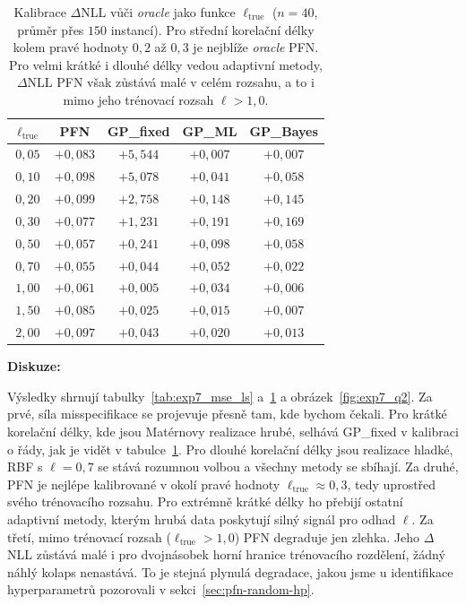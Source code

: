 \begin{table}[!htb]
    \centering
    \begin{tabular}{ccccc}
    \hline
    $\ell_{\text{true}}$ & PFN & GP\_fixed & GP\_ML & GP\_Bayes \\
    \hline
    $0{,}05$ & $+0{,}083$ & $+5{,}544$ & $+0{,}007$ & $+0{,}007$ \\
    $0{,}10$ & $+0{,}098$ & $+5{,}078$ & $+0{,}041$ & $+0{,}058$ \\
    $0{,}20$ & $+0{,}099$ & $+2{,}758$ & $+0{,}148$ & $+0{,}145$ \\
    $0{,}30$ & $+0{,}077$ & $+1{,}231$ & $+0{,}191$ & $+0{,}169$ \\
    $0{,}50$ & $+0{,}057$ & $+0{,}241$ & $+0{,}098$ & $+0{,}058$ \\
    $0{,}70$ & $+0{,}055$ & $+0{,}044$ & $+0{,}052$ & $+0{,}022$ \\
    $1{,}00$ & $+0{,}061$ & $+0{,}005$ & $+0{,}034$ & $+0{,}006$ \\
    $1{,}50$ & $+0{,}085$ & $+0{,}025$ & $+0{,}015$ & $+0{,}007$ \\
    $2{,}00$ & $+0{,}097$ & $+0{,}043$ & $+0{,}020$ & $+0{,}013$ \\
    \hline
    \end{tabular}
    \caption{Kalibrace $\Delta$NLL vůči \emph{oracle} jako funkce $\ell_{\text{true}}$ ($n = 40$, průměr přes $150$ instancí). Pro střední korelační délky kolem pravé hodnoty $0{,}2$ až $0{,}3$ je nejblíže \emph{oracle} PFN. Pro velmi krátké i dlouhé délky vedou adaptivní metody, $\Delta$NLL PFN však zůstává malé v celém rozsahu, a to i mimo jeho trénovací rozsah $\ell > 1{,}0$.}
    \label{tab:exp7_dnll_ls}
\end{table}

\textbf{Diskuze:}

Výsledky shrnují tabulky~\ref{tab:exp7_mse_ls} a~\ref{tab:exp7_dnll_ls} a obrázek~\ref{fig:exp7_q2}.
Za prvé, síla misspecifikace se projevuje přesně tam, kde bychom čekali.
Pro krátké korelační délky, kde jsou Matérnovy realizace hrubé, selhává GP\_fixed v kalibraci o řády, jak je vidět v tabulce~\ref{tab:exp7_dnll_ls}.
Pro dlouhé korelační délky jsou realizace hladké, RBF s $\ell = 0{,}7$ se stává rozumnou volbou a všechny metody se sbíhají.
Za druhé, PFN je nejlépe kalibrované v okolí pravé hodnoty $\ell_{\text{true}} \approx 0{,}3$, tedy uprostřed svého trénovacího rozsahu.
Pro extrémně krátké délky ho přebijí ostatní adaptivní metody, kterým hrubá data poskytují silný signál pro odhad $\ell$.
Za třetí, mimo trénovací rozsah ($\ell_{\text{true}} > 1{,}0$) PFN degraduje jen zlehka.
Jeho $\Delta$NLL zůstává malé i pro dvojnásobek horní hranice trénovacího rozdělení, žádný náhlý kolaps nenastává.
To je stejná plynulá degradace, jakou jsme u identifikace hyperparametrů pozorovali v sekci~\ref{sec:pfn-random-hp}.
\par

